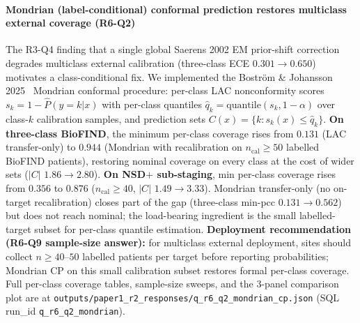 \documentclass[10pt,letterpaper]{article}
\begin{document}
\paragraph*{Mondrian (label-conditional) conformal prediction restores multiclass external coverage (R6-Q2)} The R3-Q4 finding that a single global Saerens 2002 EM prior-shift correction degrades multiclass external calibration (three-class ECE $0.301 \rightarrow 0.650$) motivates a class-conditional fix. We implemented the Bostr\"{o}m \& Johansson 2025~\cite{bostrom2025mondrian} Mondrian conformal procedure: per-class LAC nonconformity scores $s_k = 1 - \hat{P}(y{=}k|x)$ with per-class quantiles $\hat{q}_k = \mathrm{quantile}(s_k, 1{-}\alpha)$ over class-$k$ calibration samples, and prediction sets $C(x) = \{k : s_k(x) \leq \hat{q}_k\}$. \textbf{On three-class BioFIND}, the minimum per-class coverage rises from $0.131$ (LAC transfer-only) to $\mathbf{0.944}$ (Mondrian with recalibration on $n_{\mathrm{cal}}{\geq}50$ labelled BioFIND patients), restoring nominal coverage on every class at the cost of wider sets ($|C|$ $1.86 \to 2.80$). \textbf{On NSD$+$ sub-staging}, min per-class coverage rises from $0.356$ to $\mathbf{0.876}$ ($n_{\mathrm{cal}}{\geq}40$, $|C|$ $1.49 \to 3.33$). Mondrian transfer-only (no on-target recalibration) closes part of the gap (three-class min-pcc $0.131 \to 0.562$) but does not reach nominal; the load-bearing ingredient is the small labelled-target subset for per-class quantile estimation. \textbf{Deployment recommendation (R6-Q9 sample-size answer):} for multiclass external deployment, sites should collect $n{\geq}40$--$50$ labelled patients per target before reporting probabilities; Mondrian CP on this small calibration subset restores formal per-class coverage. Full per-class coverage tables, sample-size sweeps, and the 3-panel comparison plot are at \texttt{outputs/paper1\_r2\_responses/q\_r6\_q2\_mondrian\_cp.json} (SQL run\_id \texttt{q\_r6\_q2\_mondrian}).
\end{document}
